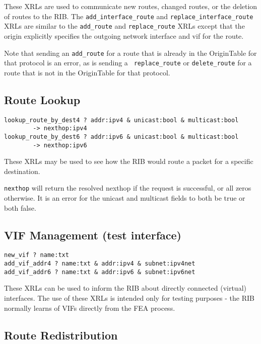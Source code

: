 \documentclass[11pt]{article}
\begin{document}
These XRLs are used to communicate new routes, changed routes, or the
deletion of routes to the RIB.
The {\tt add\_interface\_route} and {\tt replace\_interface\_route}
XRLs are similar to the {\tt add\_route} and {\tt replace\_route}
XRLs except that the origin explicitly specifies the outgoing
network interface and vif for the route.

Note that sending an {\tt add\_route} for a route that is already in
the OriginTable for that protocol is an error, as is sending a {\tt
replace\_route} or {\tt delete\_route} for a route that is not in the
OriginTable for that protocol.

\subsection{Route Lookup}

\begin{verbatim}
lookup_route_by_dest4 ? addr:ipv4 & unicast:bool & multicast:bool 
        -> nexthop:ipv4
lookup_route_by_dest6 ? addr:ipv6 & unicast:bool & multicast:bool 
        -> nexthop:ipv6
\end{verbatim}

These XRLs may be used to see how the RIB would route a packet for a
specific destination.

{\tt nexthop} will return the resolved nexthop if the request is successful,
or all zeros otherwise.  It is an error for the unicast and multicast
fields to both be true or both false.

\subsection{VIF Management (test interface)}

\begin{verbatim}
new_vif ? name:txt
add_vif_addr4 ? name:txt & addr:ipv4 & subnet:ipv4net
add_vif_addr6 ? name:txt & addr:ipv6 & subnet:ipv6net
\end{verbatim}

These XRLs can be used to inform the RIB about directly connected
(virtual) interfaces.  The use of these XRLs is intended only for
testing purposes - the RIB normally learns of VIFs directly from the
FEA process.

\subsection{Route Redistribution}
\end{document}
